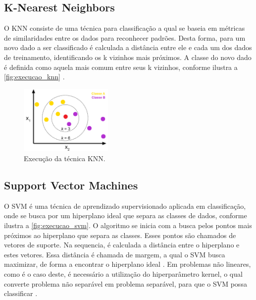 \subsection{K-Nearest Neighbors}

O KNN consiste de uma técnica para classificação a qual se baseia em métricas de similaridades entre os dados para reconhecer padrões. Desta forma, para um novo dado a ser classificado é calculada a distância entre ele e cada um dos dados de treinamento, identificando os k vizinhos mais próximos. A classe do novo dado é definida como aquela mais comum entre seus k vizinhos, conforme ilustra a \autoref{fig:execucao_knn} \cite{Khandelwal2018}.

\begin{figure}[h]
  \centering
  \caption{Execução da técnica KNN.}
   \label{fig:execucao_knn}
   \includegraphics[width=0.4\textwidth]{figuras/fig_6.png}
\end{figure}

\subsection{Support Vector Machines}

O SVM é uma técnica de aprendizado supervisionado aplicada em classificação, onde se busca por um hiperplano ideal que separa as classes de dados, conforme ilustra a \autoref{fig:execucao_svm}. O algoritmo se inicia com a busca pelos pontos mais próximos ao hiperplano que separa as classes. Esses pontos são chamados de vetores de suporte. Na sequencia, é calculada a distância entre o hiperplano e estes vetores. Essa distância é chamada de margem, a qual o SVM busca maximizar, de forma a encontrar o hiperplano ideal \cite{Pupale2019}. Em problemas não lineares, como é o caso deste, é necessário a utilização do hiperparâmetro kernel, o qual converte problema não separável em problema separável, para que o SVM possa classificar \cite{Shubham2018}.


